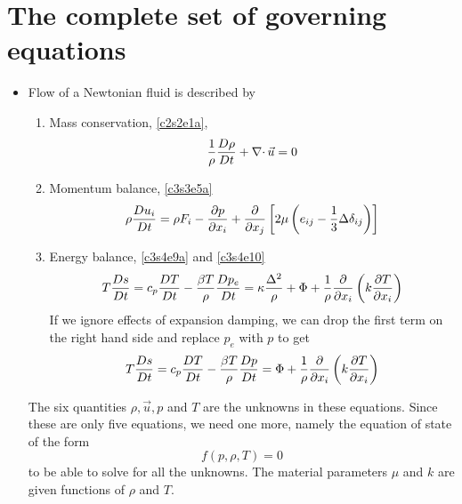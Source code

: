 \section{The complete set of governing equations}\label{c3s6}
\begin{itemize}
\item Flow of a Newtonian fluid is described by
\begin{enumerate}
\item Mass conservation, \eqref{c2s2e1a},
\begin{equation}\label{c3s6e1}
\frac{1}{\rho}\frac{D{\rho}}{Dt} + \operatorname{\nabla\cdot}\vec{u} = 0
\end{equation}
\item Momentum balance, \eqref{c3s3e5a}
\begin{equation}\label{c3s6e2}
\rho\frac{D{u_i}}{Dt} = \rho F_i - \frac{\partial{p}}{\partial{x_i}} + \frac{\partial}{\partial x_j}\left[2\mu\left(e_{ij} - \frac{1}{3}\Delta\delta_{ij}\right)\right]
\end{equation}
\item Energy balance, \eqref{c3s4e9a} and \eqref{c3s4e10}
\[
T\frac{D{s}}{Dt} = c_p\frac{D{T}}{Dt} - \frac{\beta T}{\rho}\frac{D{p_e}}{Dt} = \kappa\frac{\Delta^2}{\rho} + \Phi + \frac{1}{\rho}\frac{\partial}{\partial x_i}\left(k\frac{\partial{T}}{\partial{x_i}}\right)
\]
If we ignore effects of expansion damping, we can drop the first term on the right hand side and replace $p_e$ with $p$ to get
\begin{equation}\label{c3s6e3}
T\frac{D{s}}{Dt} = c_p\frac{D{T}}{Dt} - \frac{\beta T}{\rho}\frac{D{p}}{Dt} = \Phi + \frac{1}{\rho}\frac{\partial}{\partial x_i}\left(k\frac{\partial{T}}{\partial{x_i}}\right)
\end{equation}
\end{enumerate}
The six quantities $\rho, \vec{u}, p$ and $T$ are the unknowns in these equations. Since these are only five equations, we need one more, namely the equation of state of the form
\begin{equation}\label{c3s6e4}
f(p, \rho, T) = 0
\end{equation}
to be able to solve for all the unknowns. The material parameters $\mu$ and $k$ are given functions of $\rho$ and $T$.
\end{itemize}

